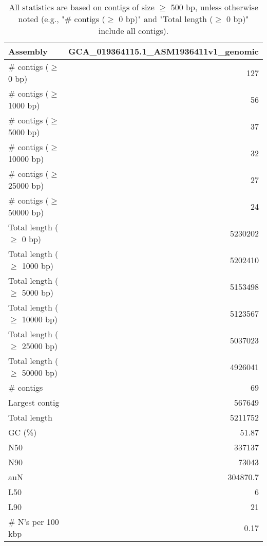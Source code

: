 \documentclass[12pt,a4paper]{article}
\begin{document}
\begin{table}[ht]
\begin{center}
\caption{All statistics are based on contigs of size $\geq$ 500 bp, unless otherwise noted (e.g., "\# contigs ($\geq$ 0 bp)" and "Total length ($\geq$ 0 bp)" include all contigs).}
\begin{tabular}{|l*{1}{|r}|}
\hline
Assembly & GCA\_019364115.1\_ASM1936411v1\_genomic \\ \hline
\# contigs ($\geq$ 0 bp) & 127 \\ \hline
\# contigs ($\geq$ 1000 bp) & 56 \\ \hline
\# contigs ($\geq$ 5000 bp) & 37 \\ \hline
\# contigs ($\geq$ 10000 bp) & 32 \\ \hline
\# contigs ($\geq$ 25000 bp) & 27 \\ \hline
\# contigs ($\geq$ 50000 bp) & 24 \\ \hline
Total length ($\geq$ 0 bp) & 5230202 \\ \hline
Total length ($\geq$ 1000 bp) & 5202410 \\ \hline
Total length ($\geq$ 5000 bp) & 5153498 \\ \hline
Total length ($\geq$ 10000 bp) & 5123567 \\ \hline
Total length ($\geq$ 25000 bp) & 5037023 \\ \hline
Total length ($\geq$ 50000 bp) & 4926041 \\ \hline
\# contigs & 69 \\ \hline
Largest contig & 567649 \\ \hline
Total length & 5211752 \\ \hline
GC (\%) & 51.87 \\ \hline
N50 & 337137 \\ \hline
N90 & 73043 \\ \hline
auN & 304870.7 \\ \hline
L50 & 6 \\ \hline
L90 & 21 \\ \hline
\# N's per 100 kbp & 0.17 \\ \hline
\end{tabular}
\end{center}
\end{table}
\end{document}
